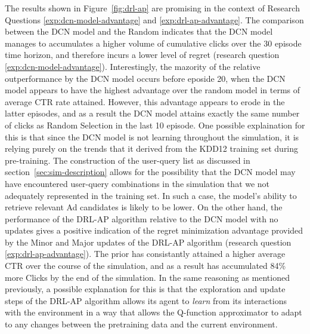 \documentclass{mldsmsc}
\begin{document}
The results shown in Figure~\ref{fig:drl-ap} are promising in the context of Research Questions
\ref{exp:dcn-model-advantage} and \ref{exp:drl-ap-advantage}. The comparison between the DCN
model and the Random indicates that the DCN model manages to accumulates a higher volume of cumulative
clicks over the 30 episode time horizon, and therefore incurs a lower level of regret (research question \ref{exp:dcn-model-advantage}). Interestingly,
the mazority of the relative outperformance by the DCN model occurs before eposide 20, when the DCN
model appears to have the highest advantage over the random model in terms of average CTR rate attained.
However, this advantage appears to erode in the latter episodes, and as a result the DCN model attains
exactly the same number of clicks as Random Selection in the last 10 episode. One possible explaination
for this is that since the DCN model is not learning throughout the simulation, it is relying purely on
the trends that it derived from the KDD12 training set during pre-training. The construction of the user-query
list as discussed in section~\ref{sec:sim-description} allows for the possibility that the DCN model may have
encountered user-query combinations in the simulation that we not adequately represented in the training set.
In such a case, the model's ability to retrieve relevant Ad candidates is likely to be lower. 
On the other hand, the performance of the DRL-AP algorithm relative to the DCN model with no updates
gives a positive indication of the regret minimization advantage provided by the Minor and Major
updates of the DRL-AP algorithm (research question \ref{exp:drl-ap-advantage}). The prior has consistantly
attained a higher average CTR over the course of the simulation, and as a result has accumulated
84\% more Clicks by the end of the simulation. In the same reasoning as mentioned previously,
a possible explanation for this is that the exploration and update steps of the DRL-AP algorithm
allows its agent to \emph{learn} from its interactions with the environment in a way that allows
the Q-function approximator to adapt to any changes between the pretraining data and the current
environment.
\end{document}
